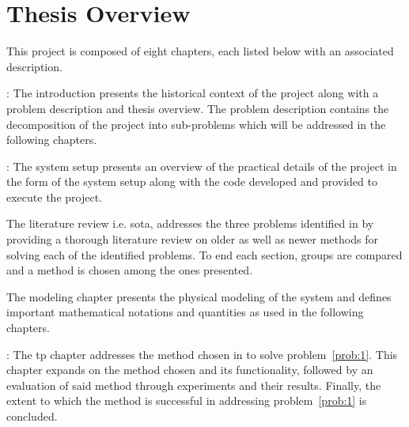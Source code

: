 
\section{Thesis Overview}\label{sec:intro-thesis-overview}

This project is composed of eight chapters, each listed below with an associated description. \medskip


\textbf{}: The introduction presents the historical context of the project along with a problem description and thesis overview. The problem description contains the decomposition of the project into sub-problems which will be addressed in the following chapters. \medskip

\textbf{}: The system setup presents an overview of the practical details of the project in the form of the system setup along with the code developed and provided to execute the project. \medskip

\textbf{} The literature review i.e. \gls{sota}, addresses the three problems identified in  by providing a thorough literature review on older as well as newer methods for solving each of the identified problems. To end each section, groups are compared and a method is chosen among the ones presented. \medskip

\textbf{} The modeling chapter presents the physical modeling of the system and defines important mathematical notations and quantities as used in the following chapters. \medskip

\textbf{}: The \gls{tp} chapter addresses the method chosen in  to solve problem~\ref{prob:1}. This chapter expands on the method chosen and its functionality, followed by an evaluation of said method through experiments and their results. Finally, the extent to which the method is successful in addressing problem~\ref*{prob:1} is concluded. \medskip

